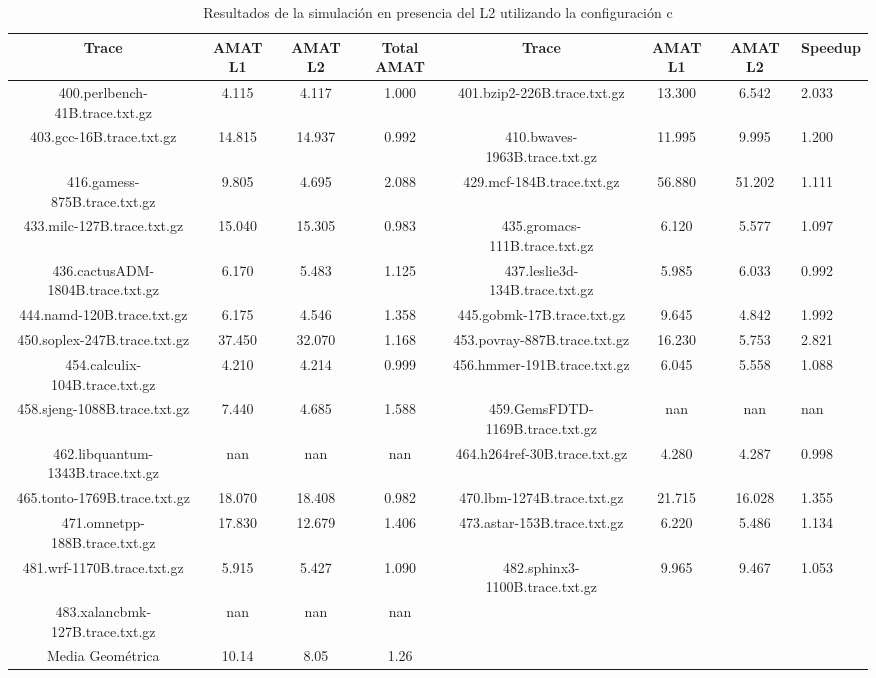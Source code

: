 \begin{table}[H]
\centering
\begin{tabular}{|c|c|c|c|c|c|c|}
\hline
Trace & AMAT L1 & AMAT L2 & Total AMAT & Trace & AMAT L1 & AMAT L2 & Speedup \\
\hline
400.perlbench-41B.trace.txt.gz & 4.115 & 4.117 & 1.000 & 401.bzip2-226B.trace.txt.gz & 13.300 & 6.542 & 2.033 \\\hline
403.gcc-16B.trace.txt.gz & 14.815 & 14.937 & 0.992 & 410.bwaves-1963B.trace.txt.gz & 11.995 & 9.995 & 1.200 \\\hline
416.gamess-875B.trace.txt.gz & 9.805 & 4.695 & 2.088 & 429.mcf-184B.trace.txt.gz & 56.880 & 51.202 & 1.111 \\\hline
433.milc-127B.trace.txt.gz & 15.040 & 15.305 & 0.983 & 435.gromacs-111B.trace.txt.gz & 6.120 & 5.577 & 1.097 \\\hline
436.cactusADM-1804B.trace.txt.gz & 6.170 & 5.483 & 1.125 & 437.leslie3d-134B.trace.txt.gz & 5.985 & 6.033 & 0.992 \\\hline
444.namd-120B.trace.txt.gz & 6.175 & 4.546 & 1.358 & 445.gobmk-17B.trace.txt.gz & 9.645 & 4.842 & 1.992 \\\hline
450.soplex-247B.trace.txt.gz & 37.450 & 32.070 & 1.168 & 453.povray-887B.trace.txt.gz & 16.230 & 5.753 & 2.821 \\\hline
454.calculix-104B.trace.txt.gz & 4.210 & 4.214 & 0.999 & 456.hmmer-191B.trace.txt.gz & 6.045 & 5.558 & 1.088 \\\hline
458.sjeng-1088B.trace.txt.gz & 7.440 & 4.685 & 1.588 & 459.GemsFDTD-1169B.trace.txt.gz & nan & nan & nan \\\hline
462.libquantum-1343B.trace.txt.gz & nan & nan & nan & 464.h264ref-30B.trace.txt.gz & 4.280 & 4.287 & 0.998 \\\hline
465.tonto-1769B.trace.txt.gz & 18.070 & 18.408 & 0.982 & 470.lbm-1274B.trace.txt.gz & 21.715 & 16.028 & 1.355 \\\hline
471.omnetpp-188B.trace.txt.gz & 17.830 & 12.679 & 1.406 & 473.astar-153B.trace.txt.gz & 6.220 & 5.486 & 1.134 \\\hline
481.wrf-1170B.trace.txt.gz & 5.915 & 5.427 & 1.090 & 482.sphinx3-1100B.trace.txt.gz & 9.965 & 9.467 & 1.053 \\\hline
483.xalancbmk-127B.trace.txt.gz & nan & nan & nan &  &  &  &  \\\hline
Media Geométrica & 10.14 & 8.05&1.26 & & & &\\\hline
\end{tabular}
\caption{Resultados de la simulación en presencia del L2 utilizando la configuración c}
\label{tab:amatL1}
\end{table}